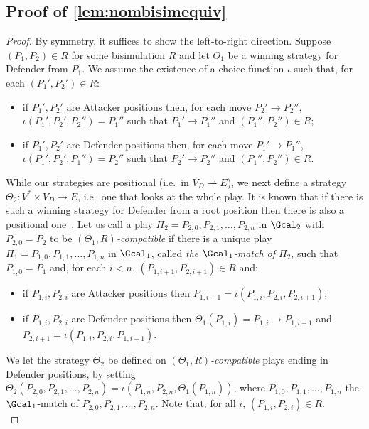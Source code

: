 \subsection{Proof of \cref{lem:nombisimequiv}}
\nombisimequiv*
\begin{proof}
  By symmetry, it suffices to show the left-to-right direction. Suppose $(P_1,P_2)\in R$ for some bisimulation $R$ and let $\Theta_1$ be a winning strategy for Defender from $P_1$. We assume the existence of a choice function $\iota$ such that, for each $(P_1',P_2')\in R$:
  \begin{itemize}
\item    if $P_1',P_2'$ are Attacker positions then, for each move $P_2'\to P_2''$, $\iota(P_1',P_2',P_2'')=P_1''$ such that $P_1'\to P_1''$ and $(P_1'',P_2'')\in R$; 
\item    if $P_1',P_2'$ are Defender positions then, for each move $P_1'\to P_1''$, $\iota(P_1',P_2',P_1'')=P_2''$ such that $P_2'\to P_2''$ and $(P_1'',P_2'')\in R$.
    \end{itemize}
While our strategies are positional (i.e.\ in $V_D\rightharpoonup E$), we next define a strategy $\Theta_2:V^*\times V_D\to E$, i.e.\ one that looks at the whole play. It is known that if there is such a winning strategy for Defender from a root position then there is also a positional one~\cite{EmersonJutla91}. Let us call a play $\Pi_2=P_{2,0},P_{2,1},\dots,P_{2,n}$ in $\Gcal_2$ with $P_{2,0}=P_2$ to be \emph{$(\Theta_1,R)$-compatible} if there is a unique play 
$\Pi_1=P_{1,0},P_{1,1},\dots,P_{1,n}$ in $\Gcal_1$, called \emph{the $\Gcal_1$-match of $\Pi_2$}, such that $P_{1,0}=P_1$ and, for each $i<n$, $(P_{1,i+1},P_{2,i+1})\in R$ and:
\begin{itemize}
\item if $P_{1,i},P_{2,i}$ are Attacker positions then $P_{1,i+1}=\iota(P_{1,i},P_{2,i},P_{2,i+1})$;
\item if $P_{1,i},P_{2,i}$ are Defender positions then $\Theta_1(P_{1,i})=P_{1,i}\to P_{1,i+1}$ and $P_{2,i+1}=\iota(P_{1,i},P_{2,i},P_{1,i+1})$.
\end{itemize}
We let the strategy $\Theta_2$ be defined on \emph{$(\Theta_1,R)$-compatible} plays ending in Defender positions, by setting
$\Theta_2(P_{2,0},P_{2,1},\dots,P_{2,n})=\iota(P_{1,n},P_{2,n},\Theta_1(P_{1,n}))$, where $P_{1,0},P_{1,1},\dots,P_{1,n}$ the $\Gcal_1$-match of $P_{2,0},P_{2,1},\dots,P_{2,n}$. Note that, for all $i$, $(P_{1,i},P_{2,i})\in R$.
\\

\end{proof}
